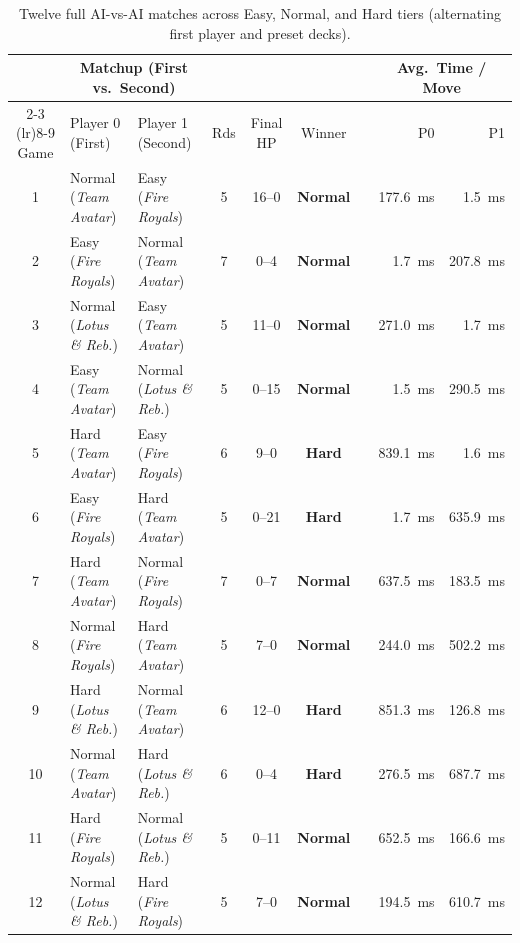 \documentclass[11pt,a4paper]{article}
\begin{document}
\begin{table}[H]
\centering
\caption{Twelve full AI-vs-AI matches across Easy, Normal, and Hard tiers (alternating first player and preset decks).}
\label{tab:tournament}
\footnotesize
\setlength{\tabcolsep}{4.5pt}
\begin{tabular}{@{}cllccclrr@{}}
\toprule
 & \multicolumn{2}{c}{Matchup (First vs.\ Second)} & & & & & \multicolumn{2}{c}{Avg.\ Time / Move} \\
\cmidrule(lr){2-3} \cmidrule(lr){8-9}
Game & Player 0 (First) & Player 1 (Second) & Rds & Final HP & Winner & & P0 & P1 \\
\midrule
1 & Normal (\emph{Team Avatar}) & Easy (\emph{Fire Royals}) & 5 & 16--0 & \textbf{Normal} & & 177.6~ms & 1.5~ms \\
2 & Easy (\emph{Fire Royals}) & Normal (\emph{Team Avatar}) & 7 & 0--4 & \textbf{Normal} & & 1.7~ms & 207.8~ms \\
3 & Normal (\emph{Lotus \& Reb.}) & Easy (\emph{Team Avatar}) & 5 & 11--0 & \textbf{Normal} & & 271.0~ms & 1.7~ms \\
4 & Easy (\emph{Team Avatar}) & Normal (\emph{Lotus \& Reb.}) & 5 & 0--15 & \textbf{Normal} & & 1.5~ms & 290.5~ms \\
\midrule
5 & Hard (\emph{Team Avatar}) & Easy (\emph{Fire Royals}) & 6 & 9--0 & \textbf{Hard} & & 839.1~ms & 1.6~ms \\
6 & Easy (\emph{Fire Royals}) & Hard (\emph{Team Avatar}) & 5 & 0--21 & \textbf{Hard} & & 1.7~ms & 635.9~ms \\
\midrule
7 & Hard (\emph{Team Avatar}) & Normal (\emph{Fire Royals}) & 7 & 0--7 & \textbf{Normal} & & 637.5~ms & 183.5~ms \\
8 & Normal (\emph{Fire Royals}) & Hard (\emph{Team Avatar}) & 5 & 7--0 & \textbf{Normal} & & 244.0~ms & 502.2~ms \\
9 & Hard (\emph{Lotus \& Reb.}) & Normal (\emph{Team Avatar}) & 6 & 12--0 & \textbf{Hard} & & 851.3~ms & 126.8~ms \\
10 & Normal (\emph{Team Avatar}) & Hard (\emph{Lotus \& Reb.}) & 6 & 0--4 & \textbf{Hard} & & 276.5~ms & 687.7~ms \\
11 & Hard (\emph{Fire Royals}) & Normal (\emph{Lotus \& Reb.}) & 5 & 0--11 & \textbf{Normal} & & 652.5~ms & 166.6~ms \\
12 & Normal (\emph{Lotus \& Reb.}) & Hard (\emph{Fire Royals}) & 5 & 7--0 & \textbf{Normal} & & 194.5~ms & 610.7~ms \\
\bottomrule
\end{tabular}
\end{table}
\end{document}
